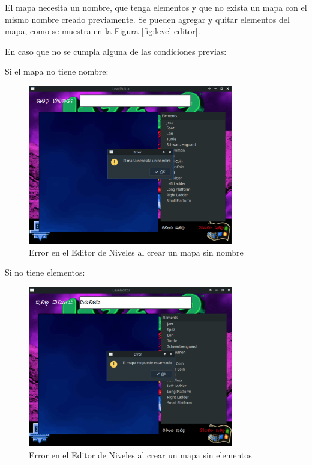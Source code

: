 \documentclass[titlepage,a4paper]{article}
\begin{document}
El mapa necesita un nombre, que tenga elementos y que no exista un mapa con el mismo nombre creado previamente. Se pueden agregar y quitar elementos del mapa, como se muestra en la Figura \ref{fig:level-editor}.

En caso que no se cumpla alguna de las condiciones previas:

Si el mapa no tiene nombre:

\begin{figure}[H]
  \centering
  \includegraphics[width=0.8\textwidth]{images/LevelEditor/NoMapName.png}
  \caption{Error en el Editor de Niveles al crear un mapa sin nombre}
  \label{fig:no-map-name}
\end{figure}

Si no tiene elementos:

\begin{figure}[H]
  \centering
  \includegraphics[width=0.8\textwidth]{images/LevelEditor/EmptyMap.png}
  \caption{Error en el Editor de Niveles al crear un mapa sin elementos}
  \label{fig:no-elements}
\end{figure}
\end{document}
